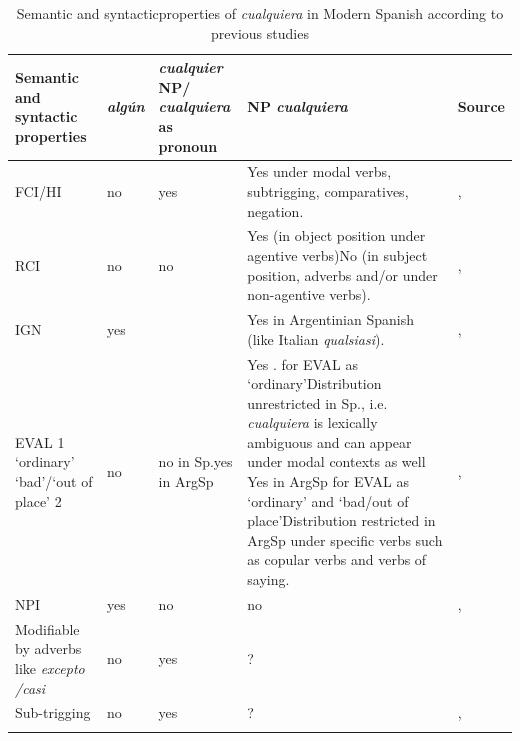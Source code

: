 \begin{table}
\footnotesize
\begin{tabularx}{\textwidth}{Q@{~}l@{~~}p{18mm}>{\raggedright}p{35mm}Q@{}}
\lsptoprule
{Semantic} {and} {syntactic} {properties} & {\textit{algún}} & {\textit{cualquier}} {NP{\slash}\newline \textit{cualquiera}} {as} {pronoun} & {NP} {\textit{cualquiera}} & {Source} \\
\midrule
{FCI/HI} & no & yes & Yes under modal verbs, subtrigging, comparatives, negation. & \citet{Falaus2013, Falaus2014}, \citet{Alonso-OvalleMenéndez-Benito2011,am2018} \citet{Aloni2007,Aloni2021}\\
{RCI} & no & no & Yes (in object position under agentive verbs)\newline No (in subject position, adverbs and/or under non-agentive verbs). & \citet{ChoiRomero2008}, \citet{Alonso-OvalleMenéndez-Benito2011,am2018}\\
\tablevspace
{IGN} & yes &  & Yes in Argentinian Spanish (like Italian \textit{qualsiasi}). & \citet{Chierchia2006}, \citet{Kellert-francia-2023}\\
\tablevspace
{EVAL} {1} {‘ordinary’} ‘bad’/{‘out} {of} {place’} {2} & no & no in Sp.\newline  yes in ArgSp & Yes . for EVAL as ‘ordinary’\newline Distribution unrestricted in Sp., i.e. \textit{cualquiera} is lexically ambiguous and can appear under modal contexts as well \newline Yes in ArgSp for EVAL as ‘ordinary’ and ‘bad/out of place’\newline Distribution restricted in ArgSp under specific verbs such as copular verbs and verbs of saying. & \citet{Alonso-OvalleMenéndez-Benito2011,am2018}, \citet{Rivero2011,Fălăuş2015,Conde2011,Rizzosalierno2013}\\
\tablevspace
{NPI}  & yes & no & no & \citet{Arregui2006}, \citet{AloniEtAl2010}\\
\tablevspace
{Modifiable} {by} {adverbs} {like} {\textit{excepto /}}{\textit{casi}} & no & yes & ? & \citet{Arregui2006}\\
\tablevspace
{Sub-trigging}  & no & yes & ? & \citet{Quer2000}, \citet{AloniEtAl2010}\\
\lspbottomrule
\end{tabularx}

\caption{\label{tab:key:4} Semantic and syntacticproperties of \textit{cualquiera} in Modern Spanish according to previous studies}
\end{table} %

